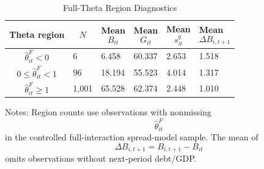 \begin{table}[H]\centering
\begin{threeparttable}
\caption{Full-Theta Region Diagnostics}
\label{tab:theta_region_stats}
\scriptsize
\begin{tabularx}{\textwidth}{lYYYYY}
\toprule
Theta region & $$N$$ & Mean $$B_{it}$$ & Mean $$G_{it}$$ & Mean $$s^g_{it}$$ & Mean $$\Delta B_{i,t+1}$$ \\
\midrule
$$\widehat{\theta}^{F}_{it}<0$$ & 6 & 6.458 & 60.337 & 2.653 & 1.518 \\
$$0\leq\widehat{\theta}^{F}_{it}<1$$ & 96 & 18.194 & 55.523 & 4.014 & 1.317 \\
$$\widehat{\theta}^{F}_{it}\geq 1$$ & 1,001 & 65.528 & 62.374 & 2.448 & 1.010 \\
\bottomrule
\end{tabularx}
\begin{tablenotes}[flushleft]\footnotesize
\item Notes: Region counts use observations with nonmissing $$\widehat{\theta}^{F}_{it}$$ in the controlled full-interaction spread-model sample. The mean of $$\Delta B_{i,t+1}=B_{i,t+1}-B_{it}$$ omits observations without next-period debt/GDP.
\end{tablenotes}
\end{threeparttable}
\end{table}
